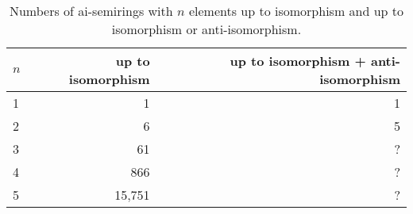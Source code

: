 \documentclass{article}
\begin{document}
\begin{table}[h]
  \centering
  \begin{tabular}{l|r|r}
    \toprule
    $n$ & up to isomorphism & up to isomorphism + anti-isomorphism \\
    \midrule
    1 & 1      & 1 \\
    2 & 6      & 5 \\
    3 & 61     & ? \\
    4 & 866    & ? \\
    5 & 15,751 & ? \\
  \end{tabular}
  \caption{Numbers of ai-semirings with $n$ elements up to isomorphism and up
  to isomorphism or anti-isomorphism.}
  \label{tab:example}
\end{table}
\end{document}
